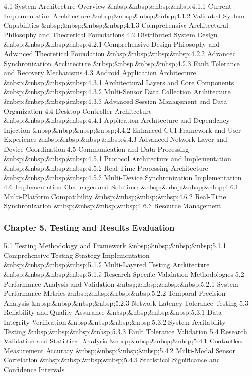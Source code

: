\documentclass[12pt,a4paper]{report}
\begin{document}
4.1 System Architecture Overview  
\&nbsp;\&nbsp;\&nbsp;\&nbsp;4.1.1 Current Implementation Architecture  
\&nbsp;\&nbsp;\&nbsp;\&nbsp;4.1.2 Validated System Capabilities  
\&nbsp;\&nbsp;\&nbsp;\&nbsp;4.1.3 Comprehensive Architectural Philosophy and Theoretical Foundations  
4.2 Distributed System Design  
\&nbsp;\&nbsp;\&nbsp;\&nbsp;4.2.1 Comprehensive Design Philosophy and Advanced Theoretical Foundation  
\&nbsp;\&nbsp;\&nbsp;\&nbsp;4.2.2 Advanced Synchronization Architecture  
\&nbsp;\&nbsp;\&nbsp;\&nbsp;4.2.3 Fault Tolerance and Recovery Mechanisms  
4.3 Android Application Architecture  
\&nbsp;\&nbsp;\&nbsp;\&nbsp;4.3.1 Architectural Layers and Core Components  
\&nbsp;\&nbsp;\&nbsp;\&nbsp;4.3.2 Multi-Sensor Data Collection Architecture  
\&nbsp;\&nbsp;\&nbsp;\&nbsp;4.3.3 Advanced Session Management and Data Organization  
4.4 Desktop Controller Architecture  
\&nbsp;\&nbsp;\&nbsp;\&nbsp;4.4.1 Application Architecture and Dependency Injection  
\&nbsp;\&nbsp;\&nbsp;\&nbsp;4.4.2 Enhanced GUI Framework and User Experience  
\&nbsp;\&nbsp;\&nbsp;\&nbsp;4.4.3 Advanced Network Layer and Device Coordination  
4.5 Communication and Data Processing  
\&nbsp;\&nbsp;\&nbsp;\&nbsp;4.5.1 Protocol Architecture and Implementation  
\&nbsp;\&nbsp;\&nbsp;\&nbsp;4.5.2 Real-Time Processing Architecture  
\&nbsp;\&nbsp;\&nbsp;\&nbsp;4.5.3 Multi-Device Synchronization Implementation  
4.6 Implementation Challenges and Solutions  
\&nbsp;\&nbsp;\&nbsp;\&nbsp;4.6.1 Multi-Platform Compatibility  
\&nbsp;\&nbsp;\&nbsp;\&nbsp;4.6.2 Real-Time Synchronization  
\&nbsp;\&nbsp;\&nbsp;\&nbsp;4.6.3 Resource Management

\subsubsection{Chapter 5. Testing and Results Evaluation}

5.1 Testing Methodology and Framework  
\&nbsp;\&nbsp;\&nbsp;\&nbsp;5.1.1 Comprehensive Testing Strategy Implementation  
\&nbsp;\&nbsp;\&nbsp;\&nbsp;5.1.2 Multi-Layered Testing Architecture  
\&nbsp;\&nbsp;\&nbsp;\&nbsp;5.1.3 Research-Specific Validation Methodologies  
5.2 Performance Analysis and Validation  
\&nbsp;\&nbsp;\&nbsp;\&nbsp;5.2.1 System Performance Metrics  
\&nbsp;\&nbsp;\&nbsp;\&nbsp;5.2.2 Temporal Precision Analysis  
\&nbsp;\&nbsp;\&nbsp;\&nbsp;5.2.3 Network Latency Tolerance Testing  
5.3 Reliability and Quality Assurance  
\&nbsp;\&nbsp;\&nbsp;\&nbsp;5.3.1 Data Integrity Verification  
\&nbsp;\&nbsp;\&nbsp;\&nbsp;5.3.2 System Availability Testing  
\&nbsp;\&nbsp;\&nbsp;\&nbsp;5.3.3 Fault Tolerance Validation  
5.4 Research Validation and Statistical Analysis  
\&nbsp;\&nbsp;\&nbsp;\&nbsp;5.4.1 Contactless Measurement Accuracy  
\&nbsp;\&nbsp;\&nbsp;\&nbsp;5.4.2 Multi-Modal Sensor Correlation  
\&nbsp;\&nbsp;\&nbsp;\&nbsp;5.4.3 Statistical Significance and Confidence Intervals
\end{document}
